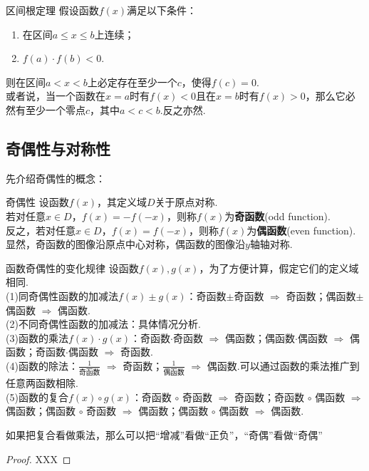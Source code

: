 \documentclass[lang=cn, zihao=4.5]{elegantbook}
\begin{document}
\begin{theorem}{区间根定理}
    假设函数$f(x)$满足以下条件：
    \begin{enumerate}
        \item 在区间$a \leq x \leq b$上连续；
        \item $f(a) \cdot f(b)<0$.
    \end{enumerate}
    则在区间$a<x<b$上必定存在至少一个$c$，使得$f(c)=0$.\\
    或者说，当一个函数在$x=a$时有$f(x)<0$且在$x=b$时有$f(x)>0$，那么它必然有至少一个零点$c$，其中$a<c<b$.反之亦然.
\end{theorem}

\subsection{奇偶性与对称性}

先介绍奇偶性的概念：

\begin{definition}{奇偶性} %
    设函数$f(x)$，其定义域$D$关于原点对称.\\
    若对任意$x \in D$，$f(x)=-f(-x)$，则称$f(x)$为\textbf{奇函数}(odd function).\\
    反之，若对任意$x \in D$，$f(x)=f(-x)$，则称$f(x)$为\textbf{偶函数}(even function).\\
    显然，奇函数的图像沿原点中心对称，偶函数的图像沿$y$轴轴对称.
\end{definition}

\begin{proposition}{函数奇偶性的变化规律}
    设函数$f(x),g(x)$，为了方便计算，假定它们的定义域相同.\\
    (1)同奇偶性函数的加减法$f(x) \pm g(x)$：奇函数$\pm$奇函数 $\Rightarrow$ 奇函数；偶函数$\pm$偶函数 $\Rightarrow$ 偶函数.\\
    (2)不同奇偶性函数的加减法：具体情况分析.\\
    (3)函数的乘法$f(x) \cdot g(x)$：奇函数$\cdot$奇函数 $\Rightarrow$ 偶函数；偶函数$\cdot$偶函数 $\Rightarrow$ 偶函数；奇函数$\cdot$偶函数 $\Rightarrow$ 奇函数.\\
    (4)函数的除法：$\frac{1}{\text{奇函数}}$ $\Rightarrow$ 奇函数；$\frac{1}{\text{偶函数}}$ $\Rightarrow$ 偶函数.可以通过函数的乘法推广到任意两函数相除.\\
    (5)函数的复合$f(x) \circ g(x)$：奇函数 $\circ$ 奇函数 $\Rightarrow$ 奇函数；奇函数 $\circ$ 偶函数 $\Rightarrow$ 偶函数；偶函数 $\circ$ 奇函数 $\Rightarrow$ 偶函数；偶函数 $\circ$ 偶函数 $\Rightarrow$ 偶函数.
\end{proposition}
\begin{remark}
	如果把复合看做乘法，那么可以把“增减”看做“正负”，“奇偶”看做“奇偶”
\end{remark}
\begin{proof}
    XXX
\end{proof}
\end{document}
